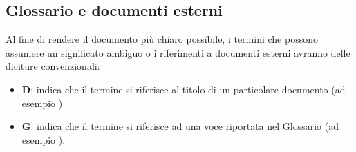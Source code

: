 \subsection{Glossario e documenti esterni}
Al fine di rendere il documento più chiaro possibile, i termini che possono assumere un significato ambiguo o i riferimenti a documenti esterni
avranno delle diciture convenzionali:

\begin{itemize}
    \item \textbf{D}: indica che il termine si riferisce al titolo di un particolare documento (ad esempio \Doc{\PdPv})
    \item \textbf{G}: indica che il termine si riferisce ad una voce riportata nel Glossario (ad esempio ).
\end{itemize}
